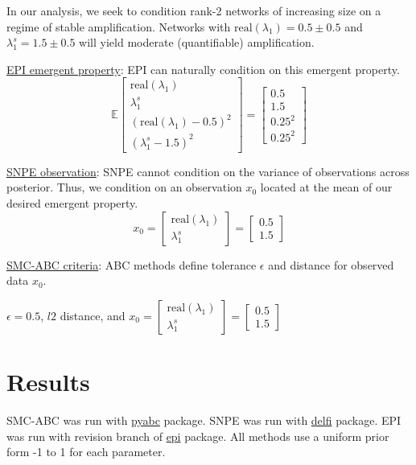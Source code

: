 \documentclass[11pt]{article}
\begin{document}
In our analysis, we seek to condition rank-2 networks of increasing size on a regime of stable amplification.  
Networks with $\text{real}(\lambda_1) = 0.5 \pm 0.5$ and $\lambda_1^s = 1.5 \pm 0.5$ will yield moderate (quantifiable) amplification.

\underline{EPI emergent property}: EPI can naturally condition on this emergent property.
\[\mathbb{E}\begin{bmatrix} \text{real}(\lambda_1) \\ \lambda^s_1 \\ (\text{real}(\lambda_1)-0.5)^2 \\ (\lambda^s_1 -1.5)^2  \end{bmatrix} = \begin{bmatrix} 0.5 \\ 1.5 \\ 0.25^2 \\ 0.25^2 \end{bmatrix}\]

\underline{SNPE observation}: SNPE cannot condition on the variance of observations across posterior.  Thus, we condition on an observation $x_0$ located at the mean of our desired emergent property.
\[x_0 = \begin{bmatrix} \text{real}(\lambda_1) \\ \lambda^s_1 \end{bmatrix} = \begin{bmatrix} 0.5 \\ 1.5 \end{bmatrix} \]

\underline{SMC-ABC criteria}: ABC methods define tolerance $\epsilon$ and distance for observed data $x_0$.\\
\begin{center}
$\epsilon = 0.5$, $l2$ distance, and  $x_0 = \begin{bmatrix} \text{real}(\lambda_1) \\ \lambda^s_1 \end{bmatrix} = \begin{bmatrix} 0.5 \\ 1.5 \end{bmatrix}$
\end{center}

\section{Results}
SMC-ABC was run with \href{https://pyabc.readthedocs.io/en/latest/index.html}{pyabc} package.  SNPE was run with \href{http://www.mackelab.org/delfi/}{delfi} package.  EPI was run with revision branch of \href{https://github.com/cunningham-lab/epi/tree/revision}{epi} package.  All methods use a uniform prior form -1 to 1 for each parameter.
\end{document}
